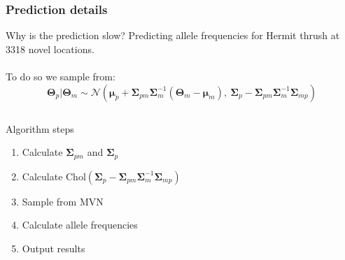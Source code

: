 \documentclass{beamer}
\begin{document}

\begin{frame}
\frametitle{Prediction details}

Why is the prediction slow? \pause Predicting allele frequencies for Hermit thrush at 3318 novel locations.\\
~\\
To do so we sample from:
\[ \bm{\Theta}_p | \bm{\Theta}_m \sim \mathcal{N}(\bm{\mu}_p+\bm\Sigma_{pm}\bm\Sigma_{m}^{-1}(\bm{\Theta}_m-\bm\mu_m),\: \bm\Sigma_{p}-\bm\Sigma_{pm}\bm\Sigma_{m}^{-1}\bm\Sigma_{mp}) \]

\pause

\vspace{-3mm}

\begin{columns}
\begin{block}{Algorithm steps}
\begin{enumerate}
\item Calculate $\bm\Sigma_{pm}$ and $\bm\Sigma_{p}$
\item Calculate $\text{Chol}(\bm\Sigma_{p}-\bm\Sigma_{pm}\bm\Sigma_{m}^{-1}\bm\Sigma_{mp})$
\item Sample from MVN
\item Calculate allele frequencies
\item Output results
\end{enumerate}
\end{block}
\end{columns}
\end{frame}

\end{document}

